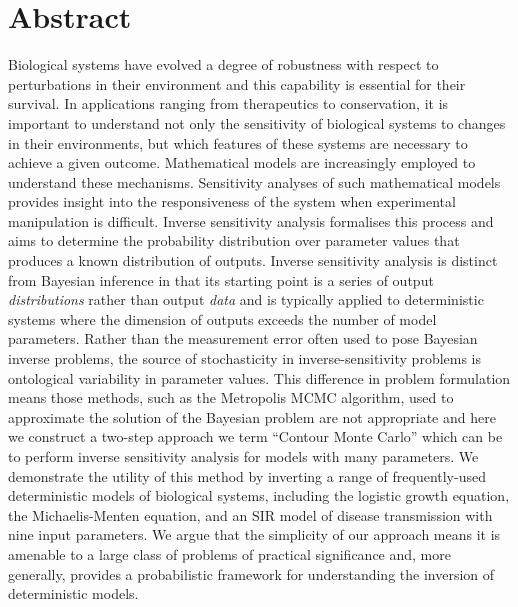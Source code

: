 \documentclass[10pt,letterpaper]{article}
\begin{document}

\newpage
\section{Abstract}

Biological systems have evolved a degree of robustness with respect to perturbations in their environment and this capability is essential for their survival. In applications ranging from therapeutics to conservation, it is important to understand not only the sensitivity of biological systems to changes in their environments, but which features of these systems are necessary to achieve a given outcome. Mathematical models are increasingly employed to understand these mechanisms. Sensitivity analyses of such mathematical models provides insight into the responsiveness of the system when experimental manipulation is difficult. Inverse sensitivity analysis formalises this process and aims to determine the probability distribution over parameter values that produces a known distribution of outputs. Inverse sensitivity analysis is distinct from Bayesian inference in that its starting point is a series of output \textit{distributions} rather than output \textit{data} and is typically applied to deterministic systems where the dimension of outputs exceeds the number of model parameters. Rather than the measurement error often used to pose Bayesian inverse problems, the source of stochasticity in inverse-sensitivity problems is ontological variability in parameter values. This difference in problem formulation means those methods, such as the Metropolis MCMC algorithm, used to approximate the solution of the Bayesian problem are not appropriate and here we construct a two-step approach we term ``Contour Monte Carlo'' which can be to perform inverse sensitivity analysis for models with many parameters. We demonstrate the utility of this method by inverting a range of frequently-used deterministic models of biological systems, including the logistic growth equation, the Michaelis-Menten equation, and an SIR model of disease transmission with nine input parameters. We argue that the simplicity of our approach means it is amenable to a large class of problems of practical significance and, more generally, provides a probabilistic framework for understanding the inversion of deterministic models.
\end{document}
